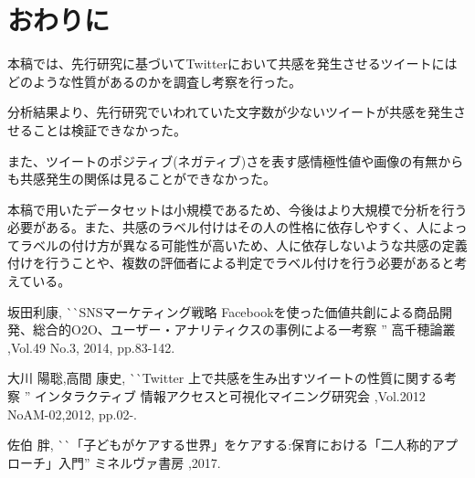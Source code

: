 \documentclass[dvipdfmx]{issj}
\begin{document}
\section{おわりに}  %

本稿では、先行研究に基づいてTwitterにおいて共感を発生させるツイートにはどのような性質があるのかを調査し考察を行った。

分析結果より、先行研究でいわれていた文字数が少ないツイートが共感を発生させることは検証できなかった。

また、ツイートのポジティブ(ネガティブ)さを表す感情極性値や画像の有無からも共感発生の関係は見ることができなかった。

本稿で用いたデータセットは小規模であるため、今後はより大規模で分析を行う必要がある。また、共感のラベル付けはその人の性格に依存しやすく、人によってラベルの付け方が異なる可能性が高いため、人に依存しないような共感の定義付けを行うことや、複数の評価者による判定でラベル付けを行う必要があると考えている。





\begin{thebibliography}{99}


   坂田利康, 
                       ^^ ^^ SNSマーケティング戦略 Facebookを使った価値共創による商品開発、総合的O2O、ユーザー・アナリティクスの事例による一考察 '' 
                       高千穂論叢 ,Vol.49 No.3, 2014, pp.83-142.

    大川 陽聡,高間 康史, 
                       ^^ ^^ Twitter 上で共感を生み出すツイートの性質に関する考察 '' 
                       インタラクティブ 情報アクセスと可視化マイニング研究会 ,Vol.2012 NoAM-02,2012, pp.02-.



   佐伯 胖,
                       ^^ ^^ 「子どもがケアする世界」をケアする:保育における「二人称的アプローチ」入門'' 
                       ミネルヴァ書房 ,2017.


\end{thebibliography}
\end{document}
